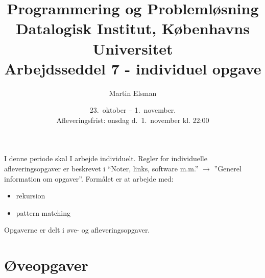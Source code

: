 \documentclass[a4paper,12pt]{article}
\title{Programmering og Problemløsning\\Datalogisk Institut,
  Københavns Universitet\\Arbejdsseddel 7 - individuel opgave}
\author{Martin Elsman}
\date{23.\ oktober -- 1.\ november.\\Afleveringsfrist: onsdag d.\ 1.\ november kl. 22:00}
\begin{document}
\maketitle

\noindent
I denne periode skal I arbejde individuelt. Regler for individuelle afleveringsopgaver er beskrevet i ``Noter, links, software m.m.'' $\rightarrow$ ''Generel information om opgaver''. Formålet er at arbejde med:
\begin{itemize}
\item rekursion
\item pattern matching
\end{itemize}

Opgaverne er delt i øve- og afleveringsopgaver.

\section*{Øveopgaver}
\end{document}
